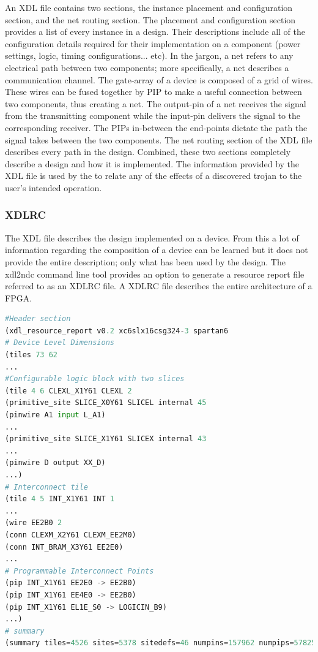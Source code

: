 An \acrshort{XDL} file contains two sections, the instance placement and configuration section, and the net routing section. 
The placement and configuration section provides a list of every instance in a design. 
Their descriptions include all of the configuration details required for their implementation on a component (power settings, logic, timing configurations... etc).
In the \Xilinx jargon, a net refers to any electrical path between two components; more specifically, a net describes a communication channel.
The gate-array of a \Xilinx device is composed of a grid of wires.
These wires can be fused together by \acrfull{PIP} to make a useful connection between two components, thus creating a net.
The output-pin of a net receives the signal from the transmitting component while the input-pin delivers the signal to the corresponding receiver.
The \acrshort{PIP}s in-between the end-points dictate the path the signal takes between the two components.
The net routing section of the \acrshort{XDL} file describes every path in the design.
Combined, these two sections completely describe a design and how it is implemented.
The information provided by the \acrshort{XDL} file is used by the \NameNoPeriod to relate any of the effects of a discovered trojan to the user's intended operation. 
\subsubsection{XDLRC} \label{sec:XDLRC}
The \acrshort{XDL} file describes the design implemented on a device.
From this a lot of information regarding the composition of a \Xilinx device can be learned but it does not provide the entire description; only what has been used by the design.
The \gls{xdl2ndc} command line tool provides an option to generate a resource report file referred to as an XDLRC file. 
A XDLRC file describes the entire architecture of a \Xilinx \acrshort{FPGA}.

\ConditionSize
\begin{lstlisting}[label={lst:xdlrc}, language=Python, caption={A hierarchical XDLRC resource description of a Spartan 6 FPGA consisting of a header, a tile section, and a trailing device summary~\cite{xdlTutorial}}]
#Header section
(xdl_resource_report v0.2 xc6slx16csg324-3 spartan6
# Device Level Dimensions
(tiles 73 62
...
#Configurable logic block with two slices
(tile 4 6 CLEXL_X1Y61 CLEXL 2
(primitive_site SLICE_X0Y61 SLICEL internal 45
(pinwire A1 input L_A1)
...
(primitive_site SLICE_X1Y61 SLICEX internal 43
...
(pinwire D output XX_D)
...)
# Interconnect tile
(tile 4 5 INT_X1Y61 INT 1
...
(wire EE2B0 2
(conn CLEXM_X2Y61 CLEXM_EE2M0)
(conn INT_BRAM_X3Y61 EE2E0)
...
# Programmable Interconnect Points
(pip INT_X1Y61 EE2E0 -> EE2B0)
(pip INT_X1Y61 EE4E0 -> EE2B0)
(pip INT_X1Y61 EL1E_S0 -> LOGICIN_B9)
...)
# summary
(summary tiles=4526 sites=5378 sitedefs=46 numpins=157962 numpips=5782505))
\end{lstlisting}
\normalsize

